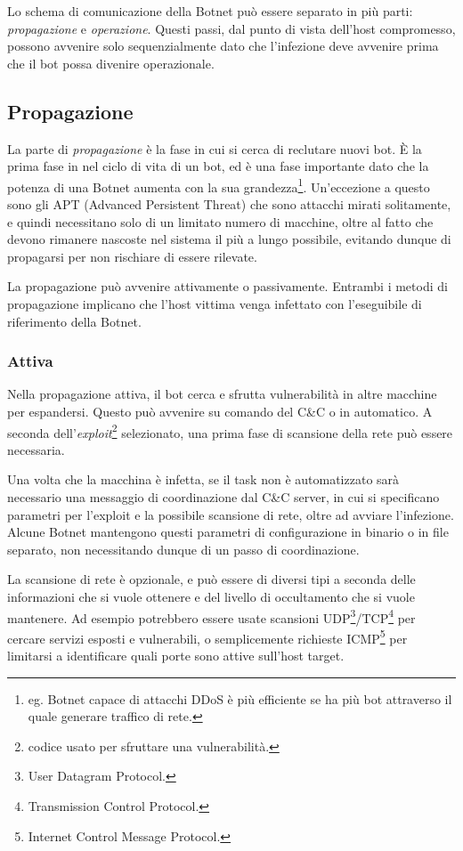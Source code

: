 Lo schema di comunicazione della Botnet può essere separato in più parti: \textit{propagazione} e \textit{operazione}. Questi passi, dal punto di vista dell'host compromesso, possono avvenire solo sequenzialmente dato che l'infezione deve avvenire prima che il bot possa divenire operazionale. 
\subsection{Propagazione}
La parte di \textit{propagazione} è la fase in cui si cerca di reclutare nuovi bot. È la prima fase in nel ciclo di vita di un bot, ed è una fase importante dato che la potenza di una Botnet aumenta con la sua grandezza\footnote{eg. Botnet capace di attacchi DDoS è più efficiente se ha più bot attraverso il quale generare traffico di rete.}. Un'eccezione a questo sono gli APT (Advanced Persistent Threat) che sono attacchi mirati solitamente, e quindi necessitano solo di un limitato numero di macchine, oltre al fatto che devono rimanere nascoste nel sistema il più a lungo possibile, evitando dunque di propagarsi per non rischiare di essere rilevate.

La propagazione può avvenire attivamente o passivamente.
Entrambi i metodi di propagazione implicano che l'host vittima venga infettato con l'eseguibile di riferimento della  Botnet. 
\subsubsection{Attiva}
\label{PropagazioneAttiva}
Nella propagazione attiva, il bot cerca e sfrutta vulnerabilità in altre macchine per espandersi. Questo può avvenire su comando del C\&C o in automatico. A seconda dell'\textit{exploit}\footnote{codice usato per sfruttare una vulnerabilità.} selezionato, una prima fase di scansione della rete può essere necessaria.


Una volta che la macchina è infetta, se il task non è automatizzato sarà necessario una messaggio di coordinazione dal C\&C server, in cui si specificano parametri per l'exploit e la possibile scansione di rete, oltre ad avviare l'infezione. Alcune Botnet mantengono questi parametri di configurazione in binario o in file separato, non necessitando dunque di un passo di coordinazione. 

La scansione di rete è opzionale, e può essere di diversi tipi a seconda delle informazioni che si vuole ottenere e del livello di occultamento che si vuole mantenere. Ad esempio potrebbero essere usate scansioni UDP\footnote{User Datagram Protocol.}/TCP\footnote{Transmission Control Protocol.} per cercare servizi esposti e vulnerabili, o semplicemente richieste ICMP\footnote{Internet Control Message Protocol.} per limitarsi a identificare quali porte sono attive sull'host target.


